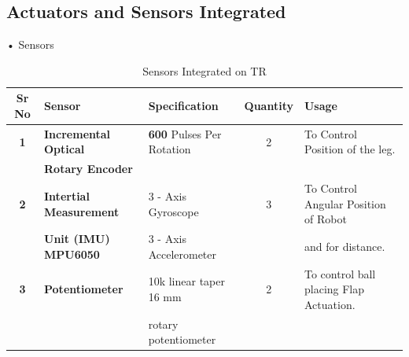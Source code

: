     \subsection{Actuators and Sensors Integrated}
            •  Sensors
            \begin{table}[h]
                \caption {Sensors Integrated on TR} \label{Sensors_TR}  \small
                \begin{tabular}{|c|l|l|c|l|}
                    \hline  \hline
                    \textbf{Sr No}  & \textbf{Sensor}                   & \textbf{Specification}                & \textbf{Quantity} & \textbf{Usage}                                   \\ \hline   \hline                    
                    \textbf{1}      & \textbf{Incremental Optical}      & \textbf{600} Pulses Per Rotation      &        2          & To Control Position of the leg.                  \\
                                    & \textbf{Rotary Encoder}           &                                       &                   &                                                  \\ \hline         
                    \textbf{2}      & \textbf{Intertial Measurement}    & 3 - Axis Gyroscope                    &        3          & To Control Angular Position of  Robot            \\ 
                                    & \textbf{Unit (IMU) MPU6050}       & 3 - Axis Accelerometer                &                   & and for distance.                                \\ \hline 
                    \textbf{3}      & \textbf{Potentiometer}            & 10k linear taper 16 mm                &        2          & To control ball placing Flap Actuation.          \\
                                    &                                   & rotary potentiometer                  &                   &                                                  \\ \hline

\end{tabular}
\end{table}

